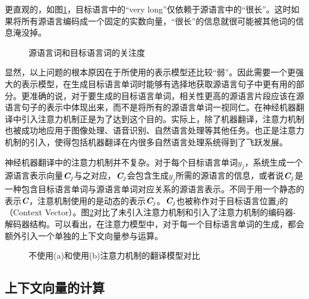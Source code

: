\parinterval 更直观的，如图\ref{fig:10-17}，目标语言中的“very long”仅依赖于源语言中的“很长”。这时如果将所有源语言编码成一个固定的实数向量，“很长”的信息就很可能被其他词的信息淹没掉。

\begin{figure}[htp]
\centering

\caption{源语言词和目标语言词的关注度}
\label{fig:10-17}
\end{figure}

\parinterval 显然，以上问题的根本原因在于所使用的表示模型还比较“弱”。因此需要一个更强大的表示模型，在生成目标语言单词时能够有选择地获取源语言句子中更有用的部分。更准确的说，对于要生成的目标语言单词，相关性更高的源语言片段应该在源语言句子的表示中体现出来，而不是将所有的源语言单词一视同仁。在神经机器翻译中引入注意力机制正是为了达到这个目的。实际上，除了机器翻译，注意力机制也被成功地应用于图像处理、语音识别、自然语言处理等其他任务。也正是注意力机制的引入，使得包括机器翻译在内很多自然语言处理系统得到了飞跃发展。

\parinterval 神经机器翻译中的注意力机制并不复杂。对于每个目标语言单词$y_j$，系统生成一个源语言表示向量$\textbf{\em C}_j$与之对应，$\textbf{\em C}_j$会包含生成$y_j$所需的源语言的信息，或者说$\textbf{\em C}_j$是一种包含目标语言单词与源语言单词对应关系的源语言表示。不同于用一个静态的表示$\textbf{\em C}$，注意机制使用的是动态的表示$\textbf{\em C}_j$。$\textbf{\em C}_j$也被称作对于目标语言位置$j$的{\small{}}（Context Vector）。图\ref{fig:10-18}对比了未引入注意力机制和引入了注意力机制的编码器- 解码器结构。可以看出，在注意力模型中，对于每一个目标语言单词的生成，都会额外引入一个单独的上下文向量参与运算。

\begin{figure}[htp]
\centering

\caption{不使用(a)和使用(b)注意力机制的翻译模型对比}
\label{fig:10-18}
\end{figure}

\subsection{上下文向量的计算}
\label{sec:10.1.3}

